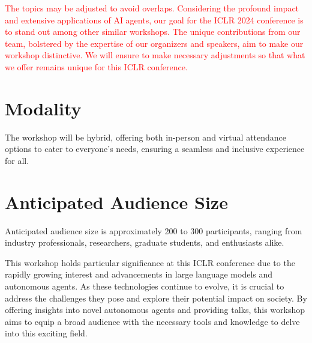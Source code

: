 \documentclass[10pt]{article} %
\begin{document}
\textcolor{red}{The topics may be adjusted to avoid overlaps. Considering the profound impact and extensive applications of AI agents, our goal for the ICLR 2024 conference is to stand out among other similar workshops. The unique contributions from our team, bolstered by the expertise of our organizers and speakers, aim to make our workshop distinctive. We will ensure to make necessary adjustments so that what we offer remains unique for this ICLR conference.}

\section{Modality}
The workshop will be hybrid, offering both in-person and virtual attendance options to cater to everyone's needs, ensuring a seamless and inclusive experience for all.

\section{Anticipated Audience Size}
Anticipated audience size is approximately 200 to 300 participants, ranging from industry professionals, researchers, graduate students, and enthusiasts alike. 

This workshop holds particular significance at this ICLR conference due to the rapidly growing interest and advancements in large language models and autonomous agents. As these technologies continue to evolve, it is crucial to address the challenges they pose and explore their potential impact on society. By offering insights into novel autonomous agents and providing talks, this workshop aims to equip a broad audience with the necessary tools and knowledge to delve into this exciting field. 

\newpage
\end{document}

